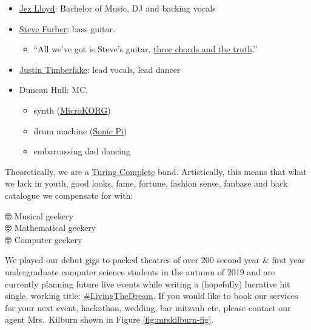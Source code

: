 \documentclass[
  12pt,
]{book}
\providecommand{\tightlist}{%
  \setlength{\itemsep}{0pt}\setlength{\parskip}{0pt}}
\begin{document}
\begin{itemize}
\tightlist
\item
  \href{https://www.linkedin.com/in/jez-lloyd-84077069}{Jez Lloyd}: Bachelor of Music, DJ and backing vocals
\item
  \href{https://en.wikipedia.org/wiki/Steve_Furber}{Steve Furber}: bass guitar.

  \begin{itemize}
  \tightlist
  \item
    ``All we've got is Steve's guitar, \href{https://en.wikipedia.org/wiki/Three_Chords_and_the_Truth}{three chords and the truth}.'' \citep{harlan, allalongthewatchtower}
  \end{itemize}
\item
  \href{https://en.wikipedia.org/wiki/Justin_Timberlake}{Justin Timberfake}: lead vocals, lead dancer \citep{cantstopthefeeling}
\item
  Duncan Hull: MC,

  \begin{itemize}
  \tightlist
  \item
    synth (\href{https://en.wikipedia.org/wiki/MicroKORG}{MicroKORG})
  \item
    drum machine (\href{https://sonic-pi.net/}{Sonic Pi})
  \item
    embarrassing dad dancing \citep{daddancing}
  \end{itemize}
\end{itemize}

Theoretically, we are a \href{https://en.wikipedia.org/wiki/Turing_completeness}{Turing Complete} band. \citep{Turing1937, turingcomplete} Artistically, this means that what we lack in youth, good looks, fame, fortune, fashion sense, fanbase and back catalogue we compensate for with:

🤓 Musical geekery \citep{musicnmaths, behindthemusic}\\
🤓 Mathematical geekery \citep{plusmaths}\\
🤓 Computer geekery \citep{Aaron2016}

We played our debut gigs to packed theatres of over 200 second year \& first year undergraduate computer science students in the autumn of 2019 and are currently planning future live events while writing a (hopefully) lucrative hit single, working title: \href{https://twitter.com/hashtag/LivingTheDream}{\#LivingTheDream}. If you would like to book our services for your next event, hackathon, wedding, bar mitzvah etc, please contact our agent Mrs.~Kilburn shown in Figure \ref{fig:mrskilburn-fig}.
\end{document}
